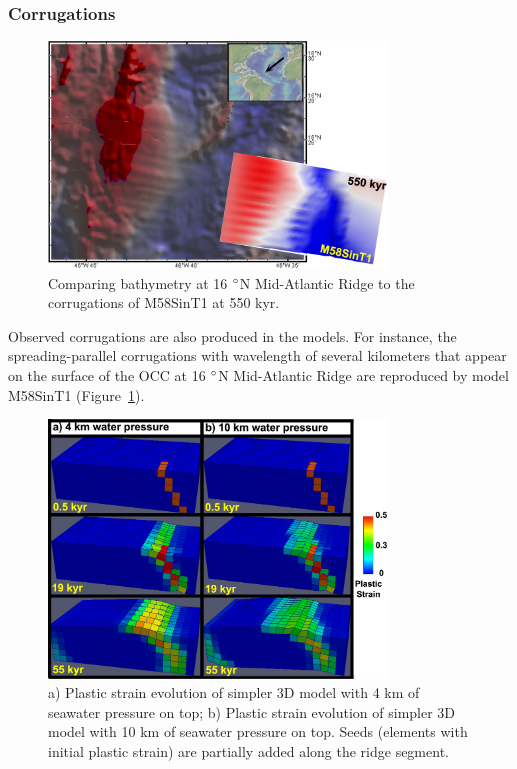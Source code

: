 \subsubsection{Corrugations}

\begin{figure}[h]
  \centering
    \includegraphics[width=0.8\textwidth]{./Figures/TOBE_USED_fig_Discussion_Observation_Corrugations_16N_MAR.eps}
  \caption{Comparing bathymetry at 16 $\degree$N Mid-Atlantic Ridge to the corrugations of M58SinT1 at 550 kyr.}
 \label{fig_Discussion_Observation_Corrugations16N_M58SinT1}
\end{figure}

Observed corrugations are also produced in the models. For instance, the spreading-parallel corrugations with wavelength of several kilometers that appear on the surface of the OCC at 16 $\degree$N Mid-Atlantic Ridge are reproduced by model M58SinT1 (Figure~\hyperref[fig_Discussion_Observation_Corrugations16N_M58SinT1]{\ref{fig_Discussion_Observation_Corrugations16N_M58SinT1}}).

\begin{figure}[h]
  \centering
    \includegraphics[width=0.8\textwidth]{./Figures/fig_Discussion_simple_models_for_corrugation_mechanism.eps}
  \caption[Simpler 3D models for formation mechanism of corrugation.]{a) Plastic strain evolution of simpler 3D model with 4 km of seawater pressure on top; b) Plastic strain evolution of simpler 3D model with 10 km of seawater pressure on top. Seeds (elements with initial plastic strain) are partially added along the ridge segment.}
 \label{fig_Discussion_simple_models_for_corrugation_mechanism}
\end{figure}

